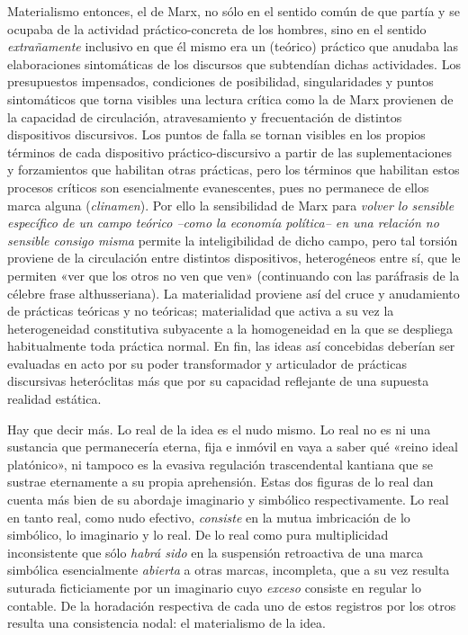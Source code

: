 Materialismo entonces, el de Marx, no sólo en el sentido común de que partía y se ocupaba de la actividad práctico-concreta de los hombres, sino en el sentido \emph{extrañamente} inclusivo en que él mismo era un (teórico) práctico que anudaba las elaboraciones sintomáticas de los discursos que subtendían dichas actividades. Los presupuestos impensados, condiciones de posibilidad, singularidades y puntos sintomáticos que torna visibles una lectura crítica como la de Marx provienen de la capacidad de circulación, atravesamiento y frecuentación de distintos dispositivos discursivos. Los puntos de falla se tornan visibles en los propios términos de cada dispositivo práctico-discursivo a partir de las suplementaciones y forzamientos que habilitan otras prácticas, pero los términos que habilitan estos procesos críticos son esencialmente evanescentes, pues no permanece de ellos marca alguna (\emph{clinamen}). Por ello la sensibilidad de Marx para \emph{volver lo sensible específico de un campo teórico --como la economía política-- en una relación no sensible consigo misma} permite la inteligibilidad de dicho campo, pero tal torsión proviene de la circulación entre distintos dispositivos, heterogéneos entre sí, que le permiten «ver que los otros no ven que ven» (continuando con las paráfrasis de la célebre frase althusseriana). La materialidad proviene así del cruce y anudamiento de prácticas teóricas y no teóricas; materialidad que activa a su vez la heterogeneidad constitutiva subyacente a la homogeneidad en la que se despliega habitualmente toda práctica normal. En fin, las ideas así concebidas deberían ser evaluadas en acto por su poder transformador y articulador de prácticas discursivas heteróclitas más que por su capacidad reflejante de una supuesta realidad estática.

Hay que decir más. Lo real de la idea es el nudo mismo. Lo real no es ni una sustancia que permanecería eterna, fija e inmóvil en vaya a saber qué «reino ideal platónico», ni tampoco es la evasiva regulación trascendental kantiana que se sustrae eternamente a su propia aprehensión. Estas dos figuras de lo real dan cuenta más bien de su abordaje imaginario y simbólico respectivamente. Lo real en tanto real, como nudo efectivo, \emph{consiste} en la mutua imbricación de lo simbólico, lo imaginario y lo real. De lo real como pura multiplicidad inconsistente que sólo \emph{habrá sido} en la suspensión retroactiva de una marca simbólica esencialmente \emph{abierta} a otras marcas, incompleta, que a su vez resulta suturada ficticiamente por un imaginario cuyo \emph{exceso} consiste en regular lo contable. De la horadación respectiva de cada uno de estos registros por los otros resulta una consistencia nodal: el materialismo de la idea.

